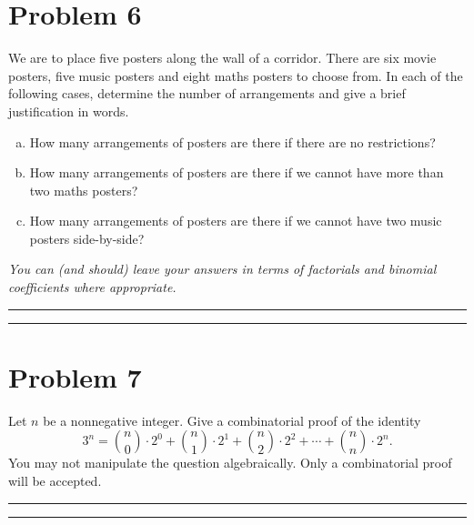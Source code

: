 \documentclass{article}
\theoremstyle{definition}
\newenvironment{solution}{\bigskip\hrule{\hfill}}{\bigskip\hrule{\hfill}} %
\begin{document}
\section*{Problem 6}
We are to place five posters along the wall of a corridor. There are six movie posters, five music posters and eight maths posters to choose from. In each of the following cases, determine the number of arrangements and give a brief justification in words.
\begin{enumerate}[a)] %
    \item How many arrangements of posters are there if there are no restrictions?
    \item How many arrangements of posters are there if we cannot have more than two maths posters?
    \item How many arrangements of posters are there if we cannot have two music posters side-by-side?
\end{enumerate}
\emph{You can (and should) leave your answers in terms of factorials and binomial coefficients where appropriate.}
\begin{solution}


\end{solution}


\newpage


\section*{Problem 7}
Let $n$ be a nonnegative integer. Give a combinatorial proof of the identity $$3^n=\binom{n}{0}\cdot2^0+\binom{n}{1}\cdot2^1+\binom{n}{2}\cdot2^2+\cdots+\binom{n}{n}\cdot2^n.$$ You may not manipulate the question algebraically. Only a combinatorial proof will be accepted.
\begin{solution}


\end{solution}
\end{document}
